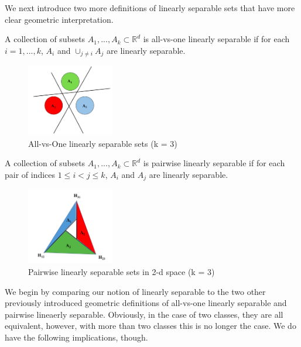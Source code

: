 We next introduce two more definitions of linearly separable sets that
have more clear geometric interpretation. 

\begin{definition}
 A collection of subsets $A_1,...,A_k\subset \mathbb{R}^d$ is
 all-vs-one linearly separable
if for each $i = 1,...,k$, 
$A_i$ and $\displaystyle \cup_{j\neq i} A_j$ are linearly separable. 
\end{definition}

\begin{figure}[H]
\centering
	\includegraphics[width=1.5in]{./figures/MulLClassfication.PNG}
	\caption{All-vs-One linearly separable sets (k = 3)}
	\label{twoclassification}
\end{figure}

\begin{definition}
  A collection of subsets $A_1,...,A_k\subset \mathbb{R}^d$ is
  pairwise linearly separable if for each pair of indices $1\leq i <
  j\leq k$, 
$A_i$ and $A_j$ are linearly separable. 
\end{definition}



\begin{figure}[H]
\centering
	\includegraphics[width=1.5in]{./figures/pairwise_linearly_separable.png}
	\caption{Pairwise linearly separable sets in 2-d space (k = 3)}
	\label{pairwise_separable_example}
\end{figure}


We begin by comparing our notion of linearly separable to the two
other previously introduced geometric definitions of all-vs-one
linearly separable and pairwise lineaerly separable.  Obviously, in
the case of two classes, they are all equivalent, however, with more
than two classes this is no longer the case. We do have the following
implications, though.

